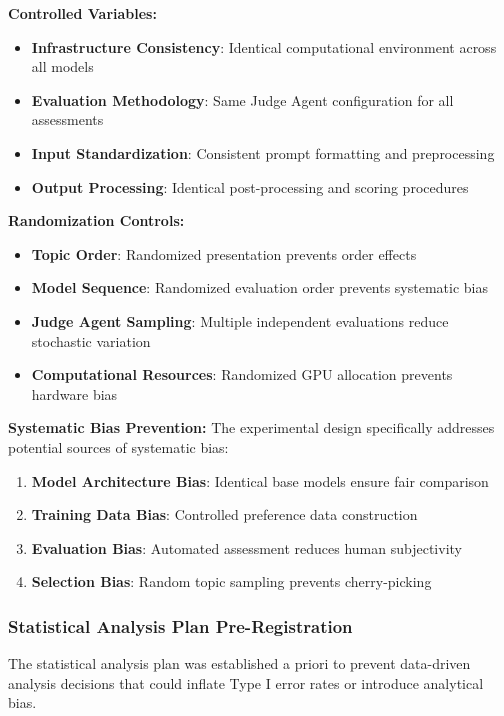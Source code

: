 \textbf{Controlled Variables:}
\begin{itemize}
    \item \textbf{Infrastructure Consistency}: Identical computational environment across all models
    \item \textbf{Evaluation Methodology}: Same Judge Agent configuration for all assessments
    \item \textbf{Input Standardization}: Consistent prompt formatting and preprocessing
    \item \textbf{Output Processing}: Identical post-processing and scoring procedures
\end{itemize}

\textbf{Randomization Controls:}
\begin{itemize}
    \item \textbf{Topic Order}: Randomized presentation prevents order effects
    \item \textbf{Model Sequence}: Randomized evaluation order prevents systematic bias
    \item \textbf{Judge Agent Sampling}: Multiple independent evaluations reduce stochastic variation
    \item \textbf{Computational Resources}: Randomized GPU allocation prevents hardware bias
\end{itemize}

\textbf{Systematic Bias Prevention:}
The experimental design specifically addresses potential sources of systematic bias:
\begin{enumerate}
    \item \textbf{Model Architecture Bias}: Identical base models ensure fair comparison
    \item \textbf{Training Data Bias}: Controlled preference data construction
    \item \textbf{Evaluation Bias}: Automated assessment reduces human subjectivity
    \item \textbf{Selection Bias}: Random topic sampling prevents cherry-picking
\end{enumerate}

\subsubsection{Statistical Analysis Plan Pre-Registration}

The statistical analysis plan was established a priori to prevent data-driven analysis decisions that could inflate Type I error rates or introduce analytical bias.

